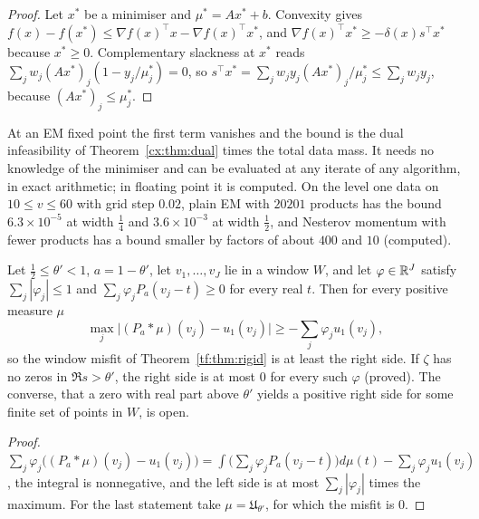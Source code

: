 \begin{proof}
Let $x^*$ be a minimiser and $\mu^*=Ax^*+b$. Convexity gives $f(x)-f(x^*)\le\nabla f(x)^\top x-\nabla f(x)^\top x^*$, and $\nabla f(x)^\top x^*\ge-\delta(x)s^\top x^*$ because $x^*\ge0$. Complementary slackness at $x^*$ reads $\sum_jw_j(Ax^*)_j(1-y_j/\mu^*_j)=0$, so $s^\top x^*=\sum_jw_jy_j(Ax^*)_j/\mu^*_j\le\sum_jw_jy_j$, because $(Ax^*)_j\le\mu^*_j$.
\end{proof}

At an EM fixed point the first term vanishes and the bound is the dual infeasibility of Theorem~\ref{cx:thm:dual} times the total data mass. It needs no knowledge of the minimiser and can be evaluated at any iterate of any algorithm, in exact arithmetic; in floating point it is computed. On the level one data on $10\le v\le60$ with grid step $0.02$, plain EM with $20201$ products has the bound $6.3\times10^{-5}$ at width $\tfrac14$ and $3.6\times10^{-3}$ at width $\tfrac12$, and Nesterov momentum with fewer products has a bound smaller by factors of about $400$ and $10$ (computed).

\begin{proposition}\label{cx:prop:wcert}
Let $\tfrac12\le\theta'<1$, $a=1-\theta'$, let $v_1,\dots,v_J$ lie in a window $W$, and let $\varphi\in\mathbb{R}^J$ satisfy $\sum_j|\varphi_j|\le1$ and $\sum_j\varphi_jP_a(v_j-t)\ge0$ for every real $t$. Then for every positive measure $\mu$
\[
\max_j\bigl|(P_a*\mu)(v_j)-u_1(v_j)\bigr|\ge-\sum_j\varphi_ju_1(v_j),
\]
so the window misfit of Theorem~\ref{tf:thm:rigid} is at least the right side. If $\zeta$ has no zeros in $\Re s>\theta'$, the right side is at most $0$ for every such $\varphi$ (proved). The converse, that a zero with real part above $\theta'$ yields a positive right side for some finite set of points in $W$, is open.
\end{proposition}

\begin{proof}
$\sum_j\varphi_j\bigl((P_a*\mu)(v_j)-u_1(v_j)\bigr)=\int\bigl(\sum_j\varphi_jP_a(v_j-t)\bigr)d\mu(t)-\sum_j\varphi_ju_1(v_j)$, the integral is nonnegative, and the left side is at most $\sum_j|\varphi_j|$ times the maximum. For the last statement take $\mu=\mathfrak U_{\theta'}$, for which the misfit is $0$.
\end{proof}

